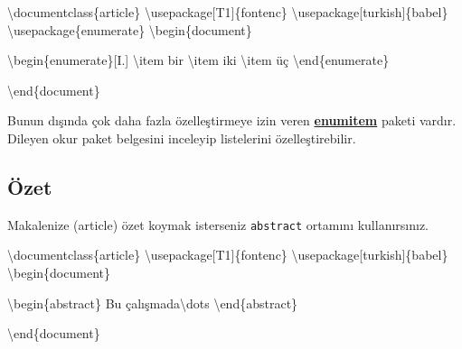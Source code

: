 \documentclass[
  letterpaper,
  DIV=11,
  numbers=noendperiod]{scrreprt}
\newenvironment{Shaded}{\begin{snugshade}}{\end{snugshade}}
\newcommand{\BuiltInTok}[1]{\textcolor[rgb]{0.00,0.23,0.31}{#1}}
\newcommand{\ExtensionTok}[1]{\textcolor[rgb]{0.00,0.23,0.31}{#1}}
\newcommand{\FunctionTok}[1]{\textcolor[rgb]{0.28,0.35,0.67}{#1}}
\newcommand{\KeywordTok}[1]{\textcolor[rgb]{0.00,0.23,0.31}{#1}}
\newcommand{\NormalTok}[1]{\textcolor[rgb]{0.00,0.23,0.31}{#1}}
\begin{document}
\begin{Shaded}
\begin{Highlighting}[]
\BuiltInTok{\textbackslash{}documentclass}\NormalTok{\{}\ExtensionTok{article}\NormalTok{\}}
\BuiltInTok{\textbackslash{}usepackage}\NormalTok{[T1]\{}\ExtensionTok{fontenc}\NormalTok{\}}
\BuiltInTok{\textbackslash{}usepackage}\NormalTok{[turkish]\{}\ExtensionTok{babel}\NormalTok{\}}
\BuiltInTok{\textbackslash{}usepackage}\NormalTok{\{}\ExtensionTok{enumerate}\NormalTok{\}}
\KeywordTok{\textbackslash{}begin}\NormalTok{\{}\ExtensionTok{document}\NormalTok{\}}

\KeywordTok{\textbackslash{}begin}\NormalTok{\{}\ExtensionTok{enumerate}\NormalTok{\}[I.]}
 \FunctionTok{\textbackslash{}item}\NormalTok{ bir}
 \FunctionTok{\textbackslash{}item}\NormalTok{ iki }
 \FunctionTok{\textbackslash{}item}\NormalTok{ üç}
\KeywordTok{\textbackslash{}end}\NormalTok{\{}\ExtensionTok{enumerate}\NormalTok{\}}

\KeywordTok{\textbackslash{}end}\NormalTok{\{}\ExtensionTok{document}\NormalTok{\}}
\end{Highlighting}
\end{Shaded}

Bunun dışında çok daha fazla özelleştirmeye izin veren
\href{http://ftp.cc.uoc.gr/mirrors/CTAN/macros/latex/contrib/enumitem/enumitem.pdf}{\textbf{enumitem}}
paketi vardır. Dileyen okur paket belgesini inceleyip listelerini
özelleştirebilir.

\hypertarget{uxf6zet}{%
\subsection{Özet}\label{uxf6zet}}

Makalenize (article) özet koymak isterseniz \texttt{abstract} ortamını
kullanırsınız.

\begin{Shaded}
\begin{Highlighting}[]
\BuiltInTok{\textbackslash{}documentclass}\NormalTok{\{}\ExtensionTok{article}\NormalTok{\}}
\BuiltInTok{\textbackslash{}usepackage}\NormalTok{[T1]\{}\ExtensionTok{fontenc}\NormalTok{\}}
\BuiltInTok{\textbackslash{}usepackage}\NormalTok{[turkish]\{}\ExtensionTok{babel}\NormalTok{\}}
\KeywordTok{\textbackslash{}begin}\NormalTok{\{}\ExtensionTok{document}\NormalTok{\}}

\KeywordTok{\textbackslash{}begin}\NormalTok{\{}\ExtensionTok{abstract}\NormalTok{\}}
\NormalTok{  Bu çalışmada}\FunctionTok{\textbackslash{}dots}
\KeywordTok{\textbackslash{}end}\NormalTok{\{}\ExtensionTok{abstract}\NormalTok{\}}

\KeywordTok{\textbackslash{}end}\NormalTok{\{}\ExtensionTok{document}\NormalTok{\}}
\end{Highlighting}
\end{Shaded}
\end{document}
